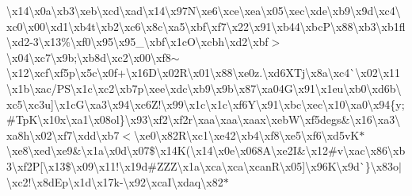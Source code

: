 \textbackslash{}x14\textbackslash{}x0a\textbackslash{}xb3\textbackslash{}xeb\textbackslash{}xcd\textbackslash{}xad\textbackslash{}x14\textbackslash{}x97\+N\textbackslash{}xe6\textbackslash{}xce\textbackslash{}xea\textbackslash{}x05\textbackslash{}xec\textbackslash{}xde\textbackslash{}xb9\textbackslash{}x9d\textbackslash{}xc4\textbackslash{}xc0\textbackslash{}x00\textbackslash{}xd1\textbackslash{}xb4t\textbackslash{}xb2\textbackslash{}xc6\textbackslash{}x8c\textbackslash{}xa5\textbackslash{}xbf\textbackslash{}xf7\textbackslash{}x22\textbackslash{}x91\textbackslash{}xb44\textbackslash{}xbc\+P\textbackslash{}x88\textbackslash{}xb3\textbackslash{}xb1fl\textbackslash{}xd2\textquotesingle{}-\/3\textbackslash{}x13\%\textbackslash{}xf0\textbackslash{}x95\textbackslash{}x95\+\_\+\textbackslash{}xbf\textbackslash{}x1c\+O\textbackslash{}xcbh\textbackslash{}xd2\textbackslash{}xbf$>$\textbackslash{}x04\textbackslash{}xc7\textbackslash{}x9b;\textbackslash{}xb8d\textbackslash{}xc2\textbackslash{}x00\textbackslash{}xf8$\sim$\textbackslash{}x12\textbackslash{}xcf\textbackslash{}xf5p\textbackslash{}x5c\textbackslash{}x0f+\textbackslash{}x16\+D\textbackslash{}x02\+R\textbackslash{}x01\textbackslash{}x88\textbackslash{}xe0z.\textbackslash{}xd6\+X\+Tj\textbackslash{}x8a\textbackslash{}xc4\`{}\textbackslash{}x02\textbackslash{}x11\textbackslash{}x1b\textbackslash{}xac/\+P\+S\textbackslash{}x1c\textbackslash{}xc2\textbackslash{}xb7p\textbackslash{}xee\textbackslash{}xdc\textbackslash{}xb9\textbackslash{}x9b\textbackslash{}x87\textbackslash{}xa04\+G\textbackslash{}x91\textbackslash{}x1eu\textbackslash{}xb0\textbackslash{}xd6b\textbackslash{}xc5\textbackslash{}xc3u\mbox{]}\textbackslash{}x1c\+G\textbackslash{}xa3\textbackslash{}x94\textbackslash{}xc6\+Z!\textbackslash{}x99\textbackslash{}x1c\textbackslash{}x1c\textbackslash{}xf6\+Y\textbackslash{}x91\textbackslash{}xbc\textbackslash{}xec\textbackslash{}x10\textbackslash{}xa0\textbackslash{}x94\{y;\#\+Tp\+K\textbackslash{}x10x\textbackslash{}xa1\textbackslash{}x08ol\}\textbackslash{}x93\textbackslash{}xf2\textbackslash{}xf2r\textbackslash{}xaa\textbackslash{}xaa\textbackslash{}xaax\textbackslash{}xeb\+W\textbackslash{}xf5degs\&\textbackslash{}x16\textbackslash{}xa3\textbackslash{}xa8h\textbackslash{}x02\textbackslash{}xf7\textbackslash{}xdd\textbackslash{}xb7$<$\textbackslash{}xe0\textbackslash{}x82\+R\textbackslash{}xc1\textbackslash{}xe42\textbackslash{}xb4\textbackslash{}xf8\textbackslash{}xe5\textbackslash{}xf6\textbackslash{}xd5v\+K$\ast$\textbackslash{}xe8\textbackslash{}xed\textbackslash{}xe9\&\textbackslash{}x1a\textbackslash{}x0d\textbackslash{}x07\$\textbackslash{}x14\+K(\textbackslash{}x14\textbackslash{}x0e\textbackslash{}x068\+A\textbackslash{}xe2\+I\&\textbackslash{}x12\#v\textbackslash{}xac\textbackslash{}x86\textbackslash{}xb3\textbackslash{}xf2\+P\mbox{[}\textbackslash{}x13\$\textbackslash{}x09\textbackslash{}x11!\textbackslash{}x19d\#\+Z\+Z\+Z\textbackslash{}x1a\textbackslash{}xca\textbackslash{}xca\textbackslash{}xcan\+R\textbackslash{}x05\mbox{]}\textbackslash{}x96\+K\textbackslash{}x9d\`{}\}\textbackslash{}x83o$\vert$\textbackslash{}xc2!\textbackslash{}x8d\+Ep\textbackslash{}x1d\textbackslash{}x17k-\/\textbackslash{}x92\textbackslash{}xca\+I\textbackslash{}xdaq\textbackslash{}x82$\ast$ 